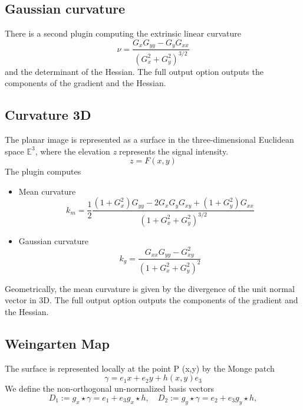 \documentclass{amsart}
\begin{document}
\subsection{Gaussian curvature}
There is a second plugin computing the extrinsic linear curvature 
\[
\nu = \frac{G_{x} G_{yy}- G_{y} G_{xx}}{\left( G_{x}^2 + G_{y}^2\right)^{3/2} }
\]
and the determinant of the Hessian.
The full output option outputs the components of the gradient and the Hessian.




\subsection{Curvature 3D}\label{sec:curvature}

The planar image is represented as a surface in the three-dimensional Euclidean space $ \mathbb{E}^3$, where the elevation \textit{z} represents the signal intensity.
\[
z = F(x,y)
\]
The plugin computes 
\begin{itemize}
	\item Mean curvature   
	\[
k_m =	\frac{1 }{2}\frac{\left( 1+G_{x}^2\right)  G_{yy} - 2 G_{x} G_{y} G_{xy} +\left(1 +G_{y}^2 \right) G_{xx}  }  {\left( 1 + G_{x}^2 +G_{y}^2\right)^{3/2}} 
	\]
 
	\item Gaussian curvature 
	\[  
k_g=	\frac {G_{xx} G_{yy} - G_{xy}^2}  {\left( 1 + G_{x}^2 +G_{y}^2\right)^2 }
	\]
\end{itemize}
Geometrically, the mean curvature is given by the divergence of the unit normal vector in 3D. 
The full output option outputs the components of the gradient and the Hessian.

\subsection{Weingarten Map}\label{sec:weing}
The surface is represented locally at the point P (x,y) by the Monge patch
\[
\gamma = e_1 x +e_2 y + h (x,y) e_3
\]
We define the non-orthogonal un-normalized basis vectors
\[
D_1:= g_x \star \gamma =e_1 + e_3 g_x \star h , \quad D_2:= g_y \star \gamma = e_2 + e_3  g_y \star h, 
\]
\end{document}
